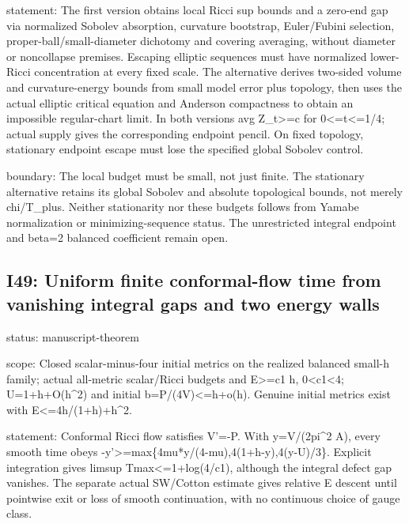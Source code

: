 \documentclass[
  10pt,
]{article}
\begin{document}
statement: The first version obtains local Ricci sup bounds and a
zero-end gap via normalized Sobolev absorption, curvature bootstrap,
Euler/Fubini selection, proper-ball/small-diameter dichotomy and
covering averaging, without diameter or noncollapse premises. Escaping
elliptic sequences must have normalized lower-Ricci concentration at
every fixed scale. The alternative derives two-sided volume and
curvature-energy bounds from small model error plus topology, then uses
the actual elliptic critical equation and Anderson compactness to obtain
an impossible regular-chart limit. In both versions avg
Z\_t\textgreater=c for 0\textless=t\textless=1/4; actual supply gives
the corresponding endpoint pencil. On fixed topology, stationary
endpoint escape must lose the specified global Sobolev control.

boundary: The local budget must be small, not just finite. The
stationary alternative retains its global Sobolev and absolute
topological bounds, not merely chi/T\_plus. Neither stationarity nor
these budgets follows from Yamabe normalization or minimizing-sequence
status. The unrestricted integral endpoint and beta=2 balanced
coefficient remain open.

\hypertarget{i49-uniform-finite-conformal-flow-time-from-vanishing-integral-gaps-and-two-energy-walls}{%
\subsection{I49: Uniform finite conformal-flow time from vanishing
integral gaps and two energy
walls}\label{i49-uniform-finite-conformal-flow-time-from-vanishing-integral-gaps-and-two-energy-walls}}

status: manuscript-theorem

scope: Closed scalar-minus-four initial metrics on the realized balanced
small-h family; actual all-metric scalar/Ricci budgets and
E\textgreater=c1 h, 0\textless c1\textless4; U=1+h+O(h\^{}2) and initial
b=P/(4V)\textless=h+o(h). Genuine initial metrics exist with
E\textless=4h/(1+h)+h\^{}2.

statement: Conformal Ricci flow satisfies V'=-P. With y=V/(2pi\^{}2 A),
every smooth time obeys
-y'\textgreater=max\{4mu*y/(4-mu),4(1+h-y),4(y-U)/3\}. Explicit
integration gives limsup Tmax\textless=1+log(4/c1), although the
integral defect gap vanishes. The separate actual SW/Cotton estimate
gives relative E descent until pointwise exit or loss of smooth
continuation, with no continuous choice of gauge class.
\end{document}
